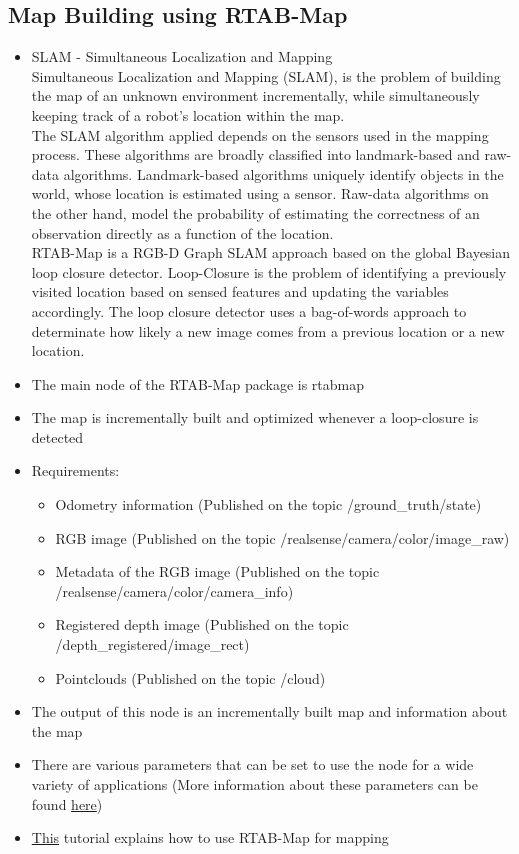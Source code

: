 \documentclass[a4paper,12pt,oneside]{book}
\begin{document}
\subsection*{Map Building using RTAB-Map}
\begin{itemize}

	\item SLAM - Simultaneous Localization and Mapping \\
	Simultaneous Localization and Mapping (SLAM), is the problem of building the map of an unknown environment incrementally, while simultaneously keeping track of a robot's location within the map. \\
	The SLAM algorithm applied depends on the sensors used in the mapping process. These algorithms are broadly classified into landmark-based and raw-data algorithms. Landmark-based algorithms uniquely identify objects in the world, whose location is estimated using a sensor. Raw-data algorithms on the other hand, model the probability of estimating the correctness of an observation directly as a function of the location. \\
	RTAB-Map is a RGB-D Graph SLAM approach based on the global Bayesian loop closure detector. Loop-Closure is the problem of identifying a previously visited location based on sensed features and updating the variables accordingly. The loop closure detector uses a bag-of-words approach to determinate how likely a new image comes from a previous location or a new location.	

	\item The main node of the RTAB-Map package is rtabmap
	\item The map is incrementally built and optimized whenever a loop-closure is detected
	\item Requirements:
		\begin{itemize}
			\item Odometry information (Published on the topic /ground\_truth/state)
			\item RGB image (Published on the topic /realsense/camera/color/image\_raw)
			\item Metadata of the RGB image (Published on the topic /realsense/camera/color/camera\_info)
			\item Registered depth image (Published on the topic /depth\_registered/image\_rect)
			\item Pointclouds (Published on the topic /cloud)
		\end{itemize}
	\item The output of this node is an incrementally built map and information about the map
	\item There are various parameters that can be set to use the node for a wide variety of applications (More information about these parameters can be found \href{http://wiki.ros.org/rtabmap_ros#rtabmap}{here})
	\item \href{https://github.com/eYSIP-2017/eYSIP-2017_Indoor-Environments-Mapping-using-UAV/blob/master/Documents/Tutorials/Using%20RTAB-Map%20for%20mapping%20with%20Kinect.pdf}{This} tutorial explains how to use RTAB-Map for mapping

\end{itemize}
\end{document}
